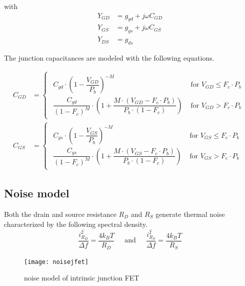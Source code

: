 \documentclass[10pt]{report}
\begin{document}
with
\begin{align}
Y_{GD} &= g_{gd} + j\omega C_{GD}\\
Y_{GS} &= g_{gs} + j\omega C_{GS}\\
Y_{DS} &= g_{ds}
\end{align}

The junction capacitances are modeled with the following equations.

\begin{align}
C_{GD} &= 
\begin{cases}
\begin{array}{ll}
C_{gd}\cdot \left(1 - \dfrac{V_{GD}}{P_{b}}\right)^{-M} & \textrm{ for } V_{GD} \le F_{c}\cdot P_{b}\\
\dfrac{C_{gd}}{\left(1 - F_{c}\right)^{M}}\cdot \left(1 + \dfrac{M\cdot \left(V_{GD} - F_{c}\cdot P_{b}\right)}{P_{b}\cdot \left(1 - F_{c}\right)}\right) & \textrm{ for } V_{GD} > F_{c}\cdot P_{b}
\end{array}
\end{cases}\\
C_{GS} &= 
\begin{cases}
\begin{array}{ll}
C_{gs}\cdot \left(1 - \dfrac{V_{GS}}{P_{b}}\right)^{-M} & \textrm{ for } V_{GS} \le F_{c}\cdot P_{b}\\
\dfrac{C_{gs}}{\left(1 - F_{c}\right)^{M}}\cdot \left(1 + \dfrac{M\cdot \left(V_{GS} - F_{c}\cdot P_{b}\right)}{P_{b}\cdot \left(1 - F_{c}\right)}\right) & \textrm{ for } V_{GS} > F_{c}\cdot P_{b}
\end{array}
\end{cases}
\end{align}

\subsection{Noise model}

Both the drain and source resistance $R_D$ and $R_S$ generate thermal
noise characterized by the following spectral density.
\begin{equation}
\dfrac{\overline{i_{R_D}^2}}{\Delta f} = \dfrac{4 k_B T}{R_D}
\;\;\;\; \textrm{ and } \;\;\;\;
\dfrac{\overline{i_{R_S}^2}}{\Delta f} = \dfrac{4 k_B T}{R_S}
\end{equation}

\begin{figure}[ht]
\begin{center}
\texttt{[image: noisejfet]}
\end{center}
\caption{noise model of intrinsic junction FET}
\label{fig:noisejfet}
\end{figure}
\FloatBarrier
\end{document}
